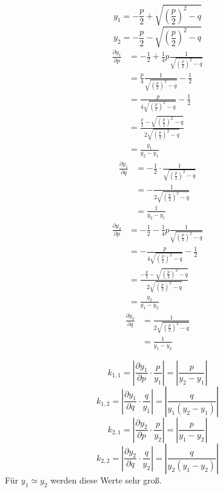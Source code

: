 \documentclass[10pt,a4paper]{article}
\begin{document}
\begin{equation}
  y_{1} = -\frac{p}{2} + \sqrt{(\frac{p}{2})^{2} - q}
\end{equation}
\begin{equation}
  y_{2} = -\frac{p}{2} - \sqrt{(\frac{p}{2})^{2} - q}
\end{equation}
\begin{align*}
  \frac{\partial y_{1}}{\partial p} & = -\frac{1}{2} + \frac{1}{4}p\frac{1}{\sqrt{(\frac{p}{2})^{2} - q}}\\
  & = \frac{p}{4}\frac{1}{\sqrt{(\frac{p}{2})^{2} - q}} - \frac{1}{2}\\
  & = \frac{p}{4 \sqrt{(\frac{p}{2})^{2} - q}} - \frac{1}{2}\\
  & = \frac{\frac{p}{2} - \sqrt{(\frac{p}{2})^{2} - q}}{2 \sqrt{(\frac{p}{2})^{2} - q}}\\
  & = \frac{y_{1}}{y_{2} - y_{1}}
\end{align*}
\begin{align*}
  \frac{\partial y_{1}}{\partial q} & = -\frac{1}{2} \cdot \frac{1}{\sqrt{(\frac{p}{2})^{2} - q}}\\
  & = -\frac{1}{2 \sqrt{(\frac{p}{2})^{2} - q}}\\
  & = \frac{1}{y_{2} - y_{1}}
\end{align*}
\begin{align*}
  \frac{\partial y_{2}}{\partial p} & = -\frac{1}{2} - \frac{1}{4}p\frac{1}{\sqrt{(\frac{p}{2})^{2} - q}}\\
  & = -\frac{p}{4\sqrt{(\frac{p}{2})^{2} - q}} - \frac{1}{2}\\
  & = \frac{-\frac{p}{2} - \sqrt{(\frac{p}{2})^{2} - q}}{2 \sqrt{(\frac{p}{2})^{2} - q}}\\
  & = \frac{y_{2}}{y_{1} - y_{2}}
\end{align*}
\begin{align*}
  \frac{\partial y_{2}}{\partial q} & = \frac{1}{2 \sqrt{(\frac{p}{2})^{2} - q}}\\
  & = \frac{1}{y_{1} - y_{2}}
\end{align*}

\begin{equation}
  k_{1, 1} = |\frac{\partial y_{1}}{\partial p} \cdot \frac{p}{y_{1}}| = |\frac{p}{y_{2} - y_{1}}|
\end{equation}
\begin{equation}
  k_{1, 2} = |\frac{\partial y_{1}}{\partial q} \cdot \frac{q}{y_{1}}| = |\frac{q}{y_{1}(y_{2} - y_{1})}|
\end{equation}
\begin{equation}
  k_{2, 1} = |\frac{\partial y_{2}}{\partial p} \cdot \frac{p}{y_{2}}| = |\frac{p}{y_{1} - y_{2}}|
\end{equation}
\begin{equation}
  k_{2, 2} = |\frac{\partial y_{2}}{\partial q} \cdot \frac{q}{y_{2}}| = |\frac{q}{y_{2}(y_{1} - y_{2})}|
\end{equation}
Für $y_{1} \simeq y_{2}$ werden diese Werte sehr groß.
\end{document}
